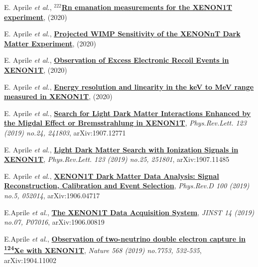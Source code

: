 

\begin{scholarship}

    \scholarshipentry{[1]}
                    {E. Aprile \textit{et al.}, \href{https://arxiv.org/abs/2009.13981v2}{\textbf{$^{222}$Rn emanation measurements for the XENON1T experiment}}, (2020)}

    \scholarshipentry{[2]}
                    {E. Aprile \textit{et al.}, \href{https://arxiv.org/abs/2007.08796}{\textbf{Projected WIMP Sensitivity of the XENONnT Dark Matter Experiment}}, (2020)}
    
    
    \scholarshipentry{[3]}
                    {E. Aprile \textit{et al.}, \href{https://arxiv.org/abs/2006.09721}{\textbf{Observation of Excess Electronic Recoil Events in XENON1T}}, (2020)}


    \scholarshipentry{[4]}
                    {E. Aprile \textit{et al.}, \href{https://arxiv.org/pdf/2003.03825.pdf}{\textbf{Energy resolution and linearity in the keV to MeV range measured in XENON1T}}, (2020)}
    
	\scholarshipentry{[5]}
					{E. Aprile \textit{et al.}, \href{https://journals.aps.org/prl/abstract/10.1103/PhysRevLett.123.241803}{\textbf{Search for Light Dark Matter Interactions Enhanced by the Migdal Effect or Bremsstrahlung in {XENON1T}}}, \textit{Phys.Rev.Lett. 123 (2019) no.24, 241803}, arXiv:1907.12771}
	
	
	\scholarshipentry{[6]}
	                {E. Aprile \textit{et al.}, \href{https://journals.aps.org/prl/abstract/10.1103/PhysRevLett.123.251801}{\textbf{Light Dark Matter Search with Ionization Signals in XENON1T}}, \textit{Phys.Rev.Lett. 123 (2019) no.25, 251801}, arXiv:1907.11485}

	
	\scholarshipentry{[7]}
	                 {E. Aprile \textit{et al.}, \href{https://journals.aps.org/prd/abstract/10.1103/PhysRevD.100.052014}{\textbf{XENON1T Dark Matter Data Analysis: Signal Reconstruction, Calibration and Event Selection}}, \textit{Phys.Rev.D 100 (2019) no.5, 052014}, arXiv:1906.04717 }
	
	
	\scholarshipentry{[8]}
	                {E.Aprile \textit{et al.}, \href{https://iopscience.iop.org/article/10.1088/1748-0221/14/07/P07016} {\textbf{The XENON1T Data Acquisition System}}, \textit{JINST 14 (2019) no.07, P07016}, arXiv:1906.00819}
	
	
	\scholarshipentry{[9]}
	                {E.Aprile \textit{et al.}, \href{https://www.nature.com/articles/s41586-019-1124-4}{\textbf{Observation of two-neutrino double electron capture in \textsuperscript{124}Xe with XENON1T}}, \textit{Nature 568 (2019) no.7753, 532-535}, arXiv:1904.11002 }
	

\end{scholarship}
